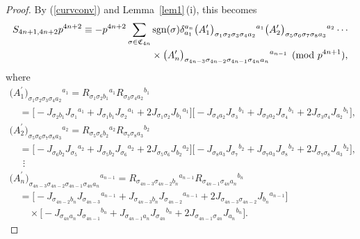 \documentclass[pdftex]{sigma}
\numberwithin{equation}{section}
\theoremstyle{definition}
\newcommand{\sgn}{{\rm sgn}}
\newcommand{\barcurvature}[2]{R_{#1}{}^{#2}}
\begin{document}
\begin{proof}
By (\ref{curvconv}) and Lemma~\ref{lem1}\,(i), this becomes
\begin{gather*}
S_{4n+1,4n+2}p^{4n+2}
 \equiv -p^{4n+2} \sum_{\sigma\in \mathfrak{C}_{4n}}
 \sgn(\sigma)
 \delta_{a_1}^{a_n}
 \bigl({A_1^\prime}\bigr)_{\sigma_1 \sigma_2 \sigma_3 \sigma_4 a_2}{}^{a_1}
 \bigl({A_2^\prime}\bigr)_{\sigma_5 \sigma_6 \sigma_7 \sigma_8 a_3}{}^{a_2}\cdots
 \\
\hphantom{S_{4n+1,4n+2}p^{4n+2} \equiv -p^{4n+2} \sum_{\sigma\in \mathfrak{C}_{4n}}}{}
 {}\times
\bigl({A_n^\prime}\bigr)_{\sigma_{4n-3} \sigma_{4n-2} \sigma_{4n-1} \sigma_{4n} a_n}{}^{a_{n-1}}
\pmod{p^{4n+1}},
\end{gather*}
where
\begin{gather*}
{\bigl({A_1^\prime}\bigr)_{\sigma_1 \sigma_2 \sigma_3 \sigma_4 a_2}{}^{a_1} = \barcurvature{\sigma_1 \sigma_2 b_1}{a_1}
\barcurvature{\sigma_3 \sigma_4 a_2}{b_1} }
 \\ \nonumber
\quad{}=\bigl[-J_{\sigma_2 b_1} J_{\sigma_1}{}^{a_1}
 +J_{\sigma_1 b_1} J_{\sigma_2}{}^{a_1}
 +2 J_{\sigma_1 \sigma_2} J_{b_1}{}^{a_1} \bigr]
\bigl[-J_{\sigma_4 a_2} J_{\sigma_3}{}^{b_1} +J_{\sigma_3 a_2} J_{\sigma_4}{}^{b_1}
 +2 J_{\sigma_3 \sigma_4} J_{a_2}{}^{b_1}\bigr],
\\ \nonumber
{\bigl({A_2^\prime}\bigr)_{\sigma_5 \sigma_6 \sigma_7 \sigma_8 a_3}{}{}^{a_2}
= \barcurvature{\sigma_5 \sigma_6 b_2}{a_2}
\barcurvature{\sigma_7 \sigma_8 a_3}{b_2}}
 \\ \nonumber
\quad{}=\bigl[-J_{\sigma_6 b_2} J_{\sigma_5}{}^{a_2}
 +J_{\sigma_5 b_2} J_{\sigma_6}{}^{a_2}
 +2 J_{\sigma_5 \sigma_6} J_{b_2}{}^{a_2} \bigr]
 \bigl[-J_{\sigma_8 a_3} J_{\sigma_7}{}^{b_2}
 +J_{\sigma_7 a_3} J_{\sigma_8}{}^{b_2}
 +2 J_{\sigma_7 \sigma_8} J_{a_3}{}^{b_2} \bigr],
 \\ \nonumber
\quad \ \, {} \vdots \\
{\bigl({A_n^\prime}\bigr)_{\sigma_{4n-3} \sigma_{4n-2} \sigma_{4n-1} \sigma_{4n} a_n}{}^{a_{n-1}}
=\barcurvature{\sigma_{4n-3} \sigma_{4n-2} b_{n}}{a_{n-1}}
\barcurvature{\sigma_{4n-1} \sigma_{4n} a_n}{b_{n}}}
\\ \nonumber
\quad{}=\bigl[-J_{\sigma_{4n-2} b_{n}} J_{\sigma_{4n-3}}{}^{a_{n-1}}
 +J_{\sigma_{4n-3} b_{n}} J_{\sigma_{4n-2}}{}^{a_{n-1}}
 +2 J_{\sigma_{4n-3} \sigma_{4n-2}} J_{b_{n}}{}^{a_{n-1}} \bigr]
 \\ \nonumber
 \quad\quad{} \times
\bigl[-J_{\sigma_{4n} a_n} J_{\sigma_{4n-1}}{}^{b_{n}}
 +J_{\sigma_{4n-1} a_n}
 J_{\sigma_{4n}}{}^{b_{n}}
 +2 J_{\sigma_{4n-1} \sigma_{4n}}
 J_{a_n}{}^{b_n} \bigr].

\end{gather*}
\end{proof}
\end{document}
